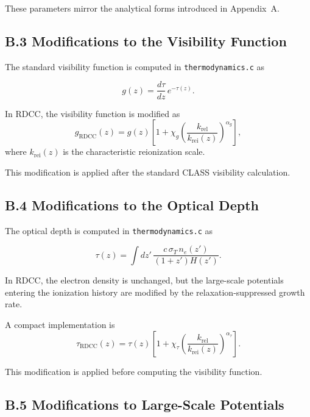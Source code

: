\documentclass[11pt,a4paper]{article}
\begin{document}
These parameters mirror the analytical forms introduced in Appendix~A.

\subsection*{B.3 Modifications to the Visibility Function}

The standard visibility function is computed in \texttt{thermodynamics.c} as


\[
g(z)
=
\frac{d\tau}{dz}\,e^{-\tau(z)}.
\]



In RDCC, the visibility function is modified as
\begin{equation}
g_{\mathrm{RDCC}}(z)
=
g(z)
\left[
1
+
\chi_{g}
\left(
\frac{k_{\mathrm{rel}}}{k_{\mathrm{rei}}(z)}
\right)^{\alpha_{g}}
\right],
\end{equation}
where $k_{\mathrm{rei}}(z)$ is the characteristic reionization scale.

This modification is applied after the standard CLASS visibility calculation.

\subsection*{B.4 Modifications to the Optical Depth}

The optical depth is computed in \texttt{thermodynamics.c} as


\[
\tau(z)
=
\int dz'\,\frac{c\,\sigma_{T}\,n_{e}(z')}{(1+z')H(z')}.
\]



In RDCC, the electron density is unchanged, but the large-scale potentials entering the
ionization history are modified by the relaxation-suppressed growth rate.

A compact implementation is
\begin{equation}
\tau_{\mathrm{RDCC}}(z)
=
\tau(z)
\left[
1
+
\chi_{\tau}
\left(
\frac{k_{\mathrm{rel}}}{k_{\mathrm{rei}}(z)}
\right)^{\alpha_{\tau}}
\right].
\end{equation}

This modification is applied before computing the visibility function.

\subsection*{B.5 Modifications to Large-Scale Potentials}
\end{document}
